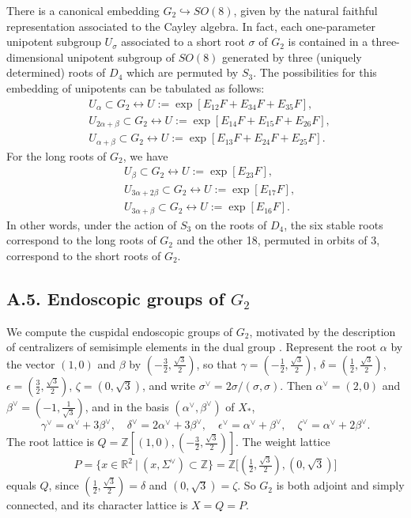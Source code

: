 \documentclass[12pt,letterpaper]{amsart}
\makeatletter
\theoremstyle{plain}
\theoremstyle{definition}
\newcommand{\fixedlabel}[1]{\phantomsection\def\@currentlabel{#1}}
\theoremstyle{remark}
\theoremstyle{definition}
\makeatother
\begin{document}
There is a canonical embedding $G_2 \hookrightarrow SO(8)$, given by
the natural faithful representation associated to the Cayley algebra.
In fact, each one-parameter unipotent subgroup $U_{\sigma}$ associated to a
short root $\sigma$ of $G_2$ is contained in a three-dimensional unipotent
subgroup of $SO(8)$ generated by three (uniquely determined) roots of
$D_4$ which are permuted by $S_3$.
The possibilities for this embedding of unipotents can be tabulated
as follows:
\[
\begin{split}
&U_{\alpha} \subset G_2 \longleftrightarrow
U := \exp[E_{12}F+E_{34}F+E_{35}F],\\
&U_{2\alpha +\beta} \subset G_2 \longleftrightarrow
U := \exp[E_{14}F+ E_{15}F+E_{26}F],\\
&U_{\alpha+\beta} \subset G_2 \longleftrightarrow
U := \exp[E_{13}F+E_{24}F+E_{25}F].
\end{split}\tag{A.14}
\]
For the long roots of $G_2$, we have
\[
\begin{split}
&U_{\beta} \subset G_2 \longleftrightarrow
U := \exp[E_{23}F],\\
&U_{3\alpha +2\beta} \subset G_2 \longleftrightarrow
U := \exp[E_{17}F],\\
&U_{3\alpha+\beta} \subset G_2 \longleftrightarrow
U := \exp[E_{16}F].
\end{split}\tag{A.15}
\]
In other words, under the action of $S_3$ on the roots of
$D_4$, the six stable roots correspond to the long roots of $G_2$
and the other 18, permuted in orbits of 3, correspond to the short
roots of $ G_2$.

\subsection*{A.5. Endoscopic groups of \texorpdfstring{$G_2$}{G2}}\fixedlabel{A.5}\label{sec:A5}

We compute the cuspidal endoscopic groups of $G_2$, motivated by the
description of centralizers of semisimple elements in the dual group
\cite[Ch.~III, \S12]{Spa82}. Represent the root $\alpha$ by the vector
$(1,0)$ and $\beta$ by $(-\frac{3}{2},\frac{\sqrt{3}}{2})$, so that
$\gamma=(-\frac12,\frac{\sqrt3}{2})$, $\delta=(\frac12,\frac{\sqrt3}2)$,
$\epsilon=(\frac32,\frac{\sqrt3}2)$, $\zeta=(0,\sqrt3)$, and write
$\sigma^{\vee}=2\sigma/(\sigma,\sigma)$. Then $\alpha^{\vee}=(2,0)$ and
$\beta^{\vee}=(-1,\frac{1}{\sqrt{3}})$, and in the basis
$(\alpha^\vee,\beta^\vee)$ of $X_*$,
\[
\gamma^\vee=\alpha^\vee+3\beta^\vee,\quad
\delta^\vee=2\alpha^\vee+3\beta^\vee,\quad
\epsilon^\vee=\alpha^\vee+\beta^\vee,\quad
\zeta^\vee=\alpha^\vee+2\beta^\vee .
\]
The root lattice is
$Q={\mathbb Z}[(1,0),(-\frac{3}{2},\frac{\sqrt{3}}{2})]$. The weight lattice
\[
P=\{x\in {\mathbb R}^2\ |\ (x,\Sigma^{\vee})\subset {\mathbb Z}\}
={\mathbb Z}\bigl[(\tfrac12,\tfrac{\sqrt{3}}{2}),(0,\sqrt{3})\bigr]
\]
equals $Q$, since $(\frac12,\frac{\sqrt3}2)=\delta$ and $(0,\sqrt3)=\zeta$.
So $G_2$ is both adjoint and simply connected, and its character lattice
is $X=Q=P$.
\end{document}
